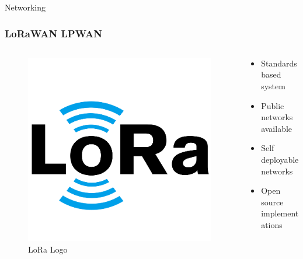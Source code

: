 \documentclass{beamer}
\begin{document}
  \begin{frame}{Networking}
    \frametitle{LoRaWAN LPWAN}
    \begin{columns}
      \begin{column}{0.5\textwidth}
        \begin{figure}[htbp]
          \centering
          \includegraphics[width=\textwidth]{lora_logo.png}
          \caption{LoRa Logo}
          \label{fig:LoRa_logo}
        \end{figure}
      \end{column}
      \begin{column}{0.5\textwidth}
        \begin{itemize}
          \item Standards based system
          \item Public networks available
          \item Self deployable networks
          \item Open source implementations
        \end{itemize}
      \end{column}
    \end{columns}
  \end{frame}
\end{document}

